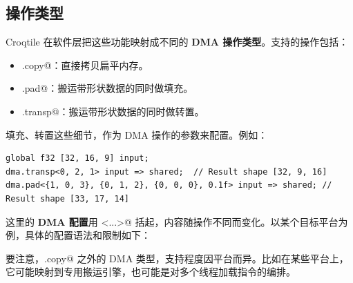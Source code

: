\subsection*{操作类型}

Croqtile 在软件层把这些功能映射成不同的 \textbf{DMA 操作类型}。支持的操作包括：

\begin{itemize}[leftmargin=1.6em]
\item \co@dma.copy@：直接拷贝扁平内存。
\item \co@dma.pad@：搬运带形状数据的同时做填充。
\item \co@dma.transp@：搬运带形状数据的同时做转置。
\end{itemize}

填充、转置这些细节，作为 DMA 操作的参数来配置。例如：

\begin{lstlisting}[language=croqtile,caption={操作类型}]
global f32 [32, 16, 9] input;
dma.transp<0, 2, 1> input => shared;  // Result shape [32, 9, 16]
dma.pad<{1, 0, 3}, {0, 1, 2}, {0, 0, 0}, 0.1f> input => shared; // Result shape [33, 17, 14]
\end{lstlisting}

这里的 \textbf{DMA 配置}用 \co@<...>@ 括起，内容随操作不同而变化。以某个目标平台为例，具体的配置语法和限制如下：

要注意，\co@dma.copy@ 之外的 DMA 类型，支持程度因平台而异。比如在某些平台上，它可能映射到专用搬运引擎，也可能是对多个线程加载指令的编排。
